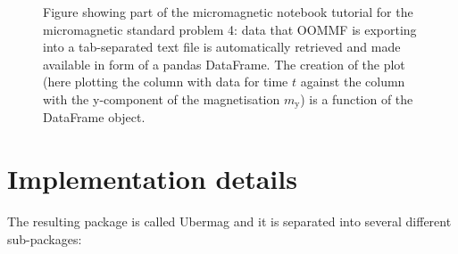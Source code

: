 \documentclass{deliverablereport}
\begin{document}
\begin{figure}
  \centering
  \caption{Figure showing part of the micromagnetic notebook tutorial
    for the micromagnetic standard problem 4: data that OOMMF is
    exporting into a tab-separated text file is automatically
    retrieved and made available in form of a pandas DataFrame. The
    creation of the plot (here plotting the column with data for time
    $t$ against the column with the y-component of the magnetisation
    $m_\mathrm{y}$) is a function of the DataFrame object.}
  \label{fig:demo3}
\end{figure}



\section{Implementation details}

The resulting package is called Ubermag and it is separated into
several different sub-packages:
\end{document}
